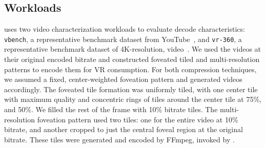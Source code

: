 \subsection{Workloads}
\nameArchprof uses two video characterization workloads to evaluate decode characteristics: \texttt{vbench}, a representative benchmark dataset from YouTube~\cite{vbench}, and \texttt{vr-360}, a representative benchmark dataset of 4K-resolution, \threesixty video~\cite{vr360-mmsys17}.
We used the videos at their original encoded bitrate and constructed foveated tiled and multi-resolution patterns to encode them for VR consumption.
For both compression techniques, we assumed a fixed, center-weighted foveation pattern and generated videos accordingly.
The foveated tile formation was uniformly tiled, with one center tile with maximum quality and concentric rings of tiles around the center tile at 75\%, and 50\%.
We filled the rest of the frame with 10\% bitrate tiles.
The multi-resolution foveation pattern used two tiles: one for the entire video at 10\% bitrate, and another cropped to just the central foveal region at the original bitrate.
These tiles were generated and encoded by {FFmpeg}, invoked by \nameArchprof.
